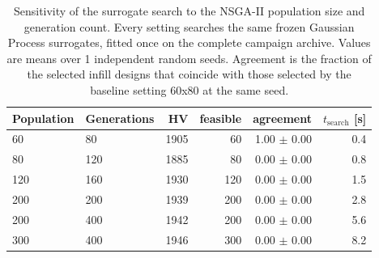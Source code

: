\begin{table}[htbp]
\centering
\caption{Sensitivity of the surrogate search to the NSGA-II population size and generation count. Every setting searches the same frozen Gaussian Process surrogates, fitted once on the complete campaign archive. Values are means over 1 independent random seeds. Agreement is the fraction of the selected infill designs that coincide with those selected by the baseline setting 60x80 at the same seed.}
\label{tab:nsga_sensitivity}
\begin{tabular}{llrrrr}
\toprule
Population & Generations & HV & feasible & agreement & $t_{\mathrm{search}}$ [s] \\
\midrule
60 & 80 & 1905 & 60 & 1.00 $\pm$ 0.00 & 0.4 \\
80 & 120 & 1885 & 80 & 0.00 $\pm$ 0.00 & 0.8 \\
120 & 160 & 1930 & 120 & 0.00 $\pm$ 0.00 & 1.5 \\
200 & 200 & 1939 & 200 & 0.00 $\pm$ 0.00 & 2.8 \\
200 & 400 & 1942 & 200 & 0.00 $\pm$ 0.00 & 5.6 \\
300 & 400 & 1946 & 300 & 0.00 $\pm$ 0.00 & 8.2 \\
\bottomrule
\end{tabular}
\end{table}
